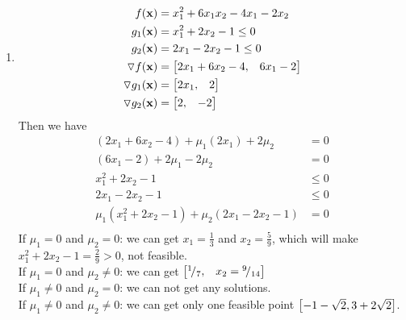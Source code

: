 \documentclass{article}
\newcommand*\rfrac[2]{{}^{#1}\!/_{#2}}
\begin{document}
\begin{enumerate} [label=(\alph*)]
\item 
\begin{align*} 
f(\boldsymbol{\mathrm{x}}) & = x_1^2 +6x_1x_2 -4x_1 -2x_2\\
g_1(\boldsymbol{\mathrm{x}}) & = x_1^2 + 2x_2 - 1 \leq 0 \\
g_2(\boldsymbol{\mathrm{x}}) & = 2x_1 -2x_2 - 1 \leq 0 \\
\triangledown f(\boldsymbol{\mathrm{x}}) &= \begin{bmatrix} 2x_1+6x_2-4, & 6x_1 -2 \end{bmatrix} \\
\triangledown g_1(\boldsymbol{\mathrm{x}}) &= \begin{bmatrix} 2x_1, &2   \end{bmatrix} \\
\triangledown g_2(\boldsymbol{\mathrm{x}}) &= \begin{bmatrix} 2, &-2 \end{bmatrix}  \\
\end{align*} 
Then we have \begin{align*} 
(2x_1 + 6x_2 -4) +\mu_1(2x_1) +2\mu_2 & = 0 \\
(6x_1-2) +2\mu_1 -2\mu_2 &= 0 \\
x_1^2 +2x_2-1 &\leq 0 \\
2x_1-2x_2-1 &\leq 0 \\
\mu_1(x_1^2 +2x_2 -1) + \mu_2 (2x_1-2x_2-1 ) &= 0 \\
\end{align*} 
If $\mu_1 = 0 $ and $\mu_2 = 0 $:   we can get $x_1=\frac{1}{3} $ and $x_2 = \frac{5}{9} $, which will make $x_1^2+2x_2-1 = \frac{2}{9} > 0  $, not feasible. \\
If $\mu_1 = 0 $ and $\mu_2 \neq 0 $:   we can get $ \bmat {\rfrac{1}{7}, & x_2 = \rfrac{9}{14}} $ \\ 
If $\mu_1 \neq 0 $ and $\mu_2 =0 $:  we can not get any solutions. \\
If $\mu_1 \neq 0 $ and $\mu_2 \neq 0 $:  we can get only one feasible point $\begin{bmatrix} -1-\sqrt{2}, 3+2\sqrt{2}  \end{bmatrix} $.\\ 




\end{enumerate} 
\end{document}
